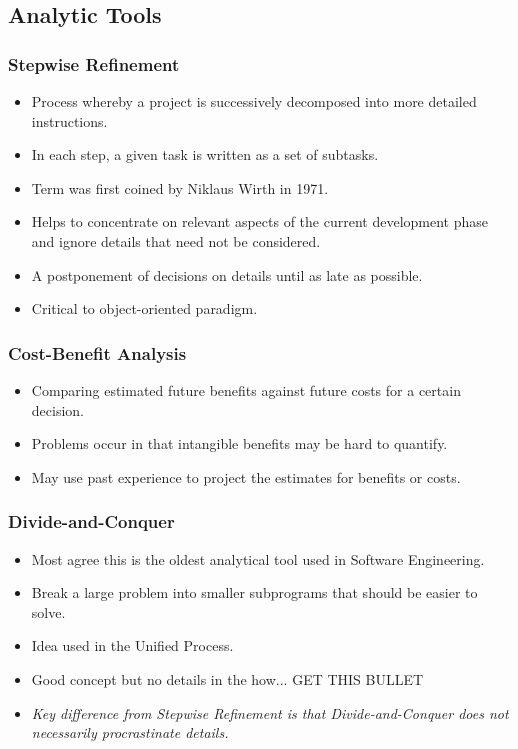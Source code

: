 \documentclass{report}
\begin{document}
			\subsection{Analytic Tools}
				\subsubsection{Stepwise Refinement}
					\begin{itemize}
						\item Process whereby a project is successively decomposed into more detailed instructions.
						\item In each step, a given task is written as a set of subtasks.
						\item Term was first coined by Niklaus Wirth in 1971.
						\item Helps to concentrate on relevant aspects of the current development phase and ignore details that need not be considered.
						\item A postponement of decisions on details until as late as possible.
						\item Critical to object-oriented paradigm.
					\end{itemize}
				\subsubsection{Cost-Benefit Analysis}
					\begin{itemize}
						\item Comparing estimated future benefits against future costs for a certain decision.
						\item Problems occur in that intangible benefits may be hard to quantify.
						\item May use past experience to project the estimates for benefits or costs.
					\end{itemize}
				\subsubsection{Divide-and-Conquer}
					\begin{itemize}
						\item Most agree this is the oldest analytical tool used in Software Engineering.
						\item Break a large problem into smaller subprograms that should be easier to solve.
						\item Idea used in the Unified Process.
						\item Good concept but no details in the how... \textsc{GET THIS BULLET}
						\item \textit{Key difference from Stepwise Refinement is that Divide-and-Conquer does not necessarily procrastinate details.}
					\end{itemize}
\end{document}

